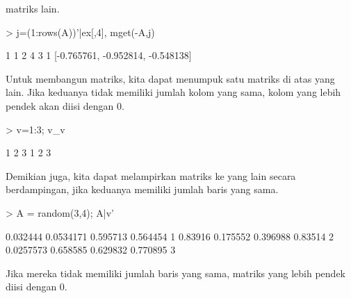 \documentclass[a4paper,10pt]{article}
\begin{document}
\begin{eulernotebook}
\begin{eulercomment}
\begin{eulercomment}
\begin{eulercomment}
\begin{eulercomment}
\begin{eulercomment}
\begin{eulercomment}
\begin{eulercomment}
matriks lain.
\end{eulercomment}
\begin{eulerprompt}
> j=(1:rows(A))'|ex[,4], mget(-A,j)
\end{eulerprompt}
\begin{euleroutput}
              1             1 
              2             4 
              3             1 
  [-0.765761,  -0.952814,  -0.548138]
\end{euleroutput}
\begin{eulercomment}
Untuk membangun matriks, kita dapat menumpuk satu matriks di atas yang
lain. Jika keduanya tidak memiliki jumlah kolom yang sama, kolom yang
lebih pendek akan diisi dengan 0.
\end{eulercomment}
\begin{eulerprompt}
> v=1:3; v_v
\end{eulerprompt}
\begin{euleroutput}
              1             2             3 
              1             2             3 
\end{euleroutput}
\begin{eulercomment}
Demikian juga, kita dapat melampirkan matriks ke yang lain secara
berdampingan, jika keduanya memiliki jumlah baris yang sama.
\end{eulercomment}
\begin{eulerprompt}
> A = random(3,4); A|v'
\end{eulerprompt}
\begin{euleroutput}
       0.032444     0.0534171      0.595713      0.564454             1 
        0.83916      0.175552      0.396988       0.83514             2 
      0.0257573      0.658585      0.629832      0.770895             3 
\end{euleroutput}
\begin{eulercomment}
Jika mereka tidak memiliki jumlah baris yang sama, matriks yang lebih
pendek diisi dengan 0.


\end{eulercomment}
\end{eulercomment}
\end{eulercomment}
\end{eulercomment}
\end{eulercomment}
\end{eulercomment}
\end{eulercomment}
\end{eulernotebook}
\end{document}
